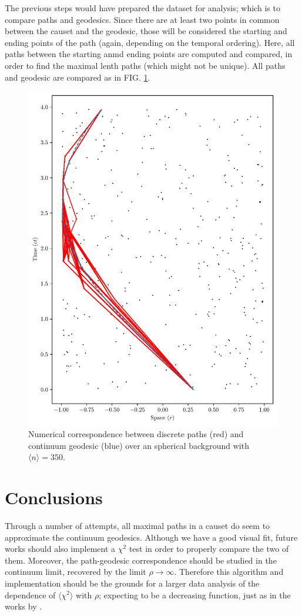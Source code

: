 \documentclass[%
 reprint,
 amsmath,amssymb,
 aps,
]{revtex4-2}
\begin{document}
The previous steps would have prepared the dataset for analysis; which is to compare paths and geodesics. Since there are at least two points in common between the causet and the geodesic, those will be considered the starting and ending points of the path (again, depending on the temporal ordering). Here, all paths between the starting anmd ending points are computed and compared, in order to find the maximal lenth paths (which might not be unique). All paths and geodesic are compared as in FIG. \ref{fig:Spherical}.
\begin{figure}
\includegraphics[width=\linewidth]{Images/Correspondence.pdf}%
\caption{\label{fig:Spherical} Numerical correspondence between discrete paths (red) and continuum geodesic (blue) over an spherical background with $\langle n\rangle=350$.}
\end{figure}
\FloatBarrier
\section{Conclusions}
Through a number of attempts, all maximal paths in a causet do seem to approximate the continuum geodesics. Although we have a good visual fit, future works should also implement a $\chi^2$ test in order to properly compare the two of them. Moreover, the path-geodesic correspondence should be studied in the continuum limit, recovered by the limit $\rho\to \infty$. Therefore this algorithm and implementation should be the grounds for a larger data analysis of the dependence of $\langle\chi^2\rangle$ with $\rho$; expecting to be a decreasing function, just as in the works by \cite{Original_Idea}.
\vfill
\nocite{*}

\end{document}
